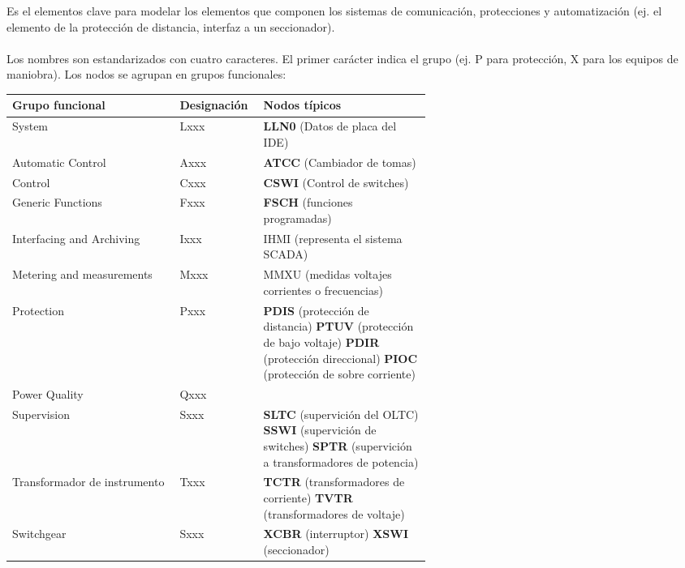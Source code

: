 \documentclass[a5paper]{book}%
\begin{document}
Es el elementos clave para modelar los elementos que componen los sistemas de comunicación, protecciones y automatización (ej. el elemento de la protección de distancia, interfaz a un seccionador).\\\\
Los nombres son estandarizados con cuatro caracteres. El primer carácter indica el grupo  (ej. P para protección, X para los equipos de maniobra). Los nodos se agrupan en grupos funcionales:

\begin{table}[H]
  \centering
  \begin{tabular}{|l | p{0.2\linewidth} |p{0.4\linewidth}|}
    \hline
    Grupo funcional & Designación & Nodos típicos \\\hline
    System & Lxxx & \textbf{LLN0} (Datos de placa del IDE) \\\hline
    Automatic Control & Axxx & \textbf{ATCC} (Cambiador de tomas) \\\hline
    Control & Cxxx & \textbf{CSWI}  (Control de switches)  \\\hline
    Generic Functions & Fxxx & \textbf{FSCH} (funciones programadas) \\\hline
    Interfacing and Archiving & Ixxx & IHMI (representa el sistema SCADA) \\\hline
    Metering  and measurements & Mxxx & MMXU (medidas voltajes corrientes  o frecuencias) \\\hline
    Protection & Pxxx & \textbf{PDIS} (protección de distancia) \textbf{PTUV} (protección de bajo voltaje) \textbf{PDIR} (protección direccional) \textbf{PIOC} (protección de sobre corriente)\\\hline

    Power Quality & Qxxx & \\\hline
    Supervision & Sxxx & \textbf{SLTC} (supervición del OLTC) \textbf{SSWI} (supervición de switches) \textbf{SPTR} (supervición a transformadores de potencia) \\\hline

    Transformador de instrumento & Txxx  & \textbf{TCTR} (transformadores de corriente) \textbf{TVTR} (transformadores de voltaje) \\\hline

    Switchgear & Sxxx & \textbf{XCBR} (interruptor) \textbf{XSWI} (seccionador) \\\hline
   
    \end{tabular}
  \end{table}
\end{document}
